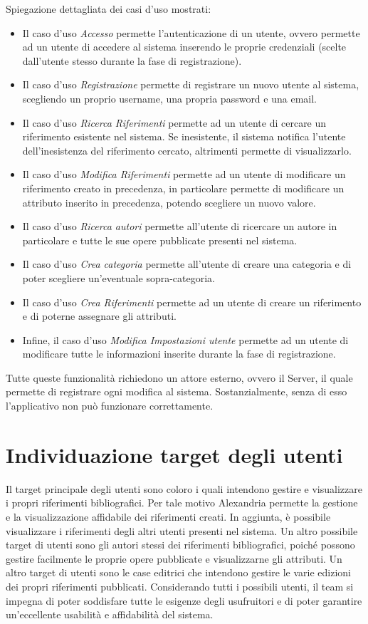 \newpage
Spiegazione dettagliata dei casi d'uso mostrati: 
\begin{itemize}
    \item Il caso d'uso \textit{Accesso} permette l'autenticazione di un utente, ovvero permette ad un utente di accedere al sistema inserendo le proprie credenziali (scelte dall'utente stesso durante la fase di registrazione).
    \item  Il caso d'uso \textit{Registrazione} permette di registrare un nuovo utente al sistema, scegliendo un proprio username, una propria password e una email.
    \item Il caso d'uso \textit{Ricerca Riferimenti} permette ad un utente di cercare un riferimento esistente nel sistema. Se inesistente, il sistema notifica l'utente dell'inesistenza del riferimento cercato, altrimenti permette di visualizzarlo. 
    \item Il caso d'uso \textit{Modifica Riferimenti} permette ad un utente di modificare un riferimento creato in precedenza, in particolare permette di modificare un \gls{attributo} inserito in precedenza,  potendo scegliere un nuovo valore. 
    \item  Il caso d'uso \textit{Ricerca autori} permette all'utente di ricercare un autore in particolare e tutte le sue opere pubblicate presenti nel sistema.
    \item Il caso d'uso \textit{Crea categoria} permette all'utente di creare una categoria e di poter scegliere un'eventuale \gls{sopra-categoria}.
    \item  Il caso d'uso \textit{Crea Riferimenti} permette ad un utente di creare un riferimento e di poterne assegnare gli attributi. 
    \item Infine, il caso d'uso \textit{Modifica Impostazioni utente} permette ad un utente di modificare tutte le informazioni inserite durante la fase di registrazione.
\end{itemize}
Tutte queste funzionalità richiedono un attore esterno, ovvero il Server, il quale permette di registrare ogni modifica al sistema. Sostanzialmente, senza di esso l'applicativo non può funzionare correttamente.


\raggedright{\section{Individuazione target degli utenti}}
Il target principale degli utenti sono coloro i quali intendono gestire e visualizzare i propri riferimenti bibliografici. Per tale motivo Alexandria permette la gestione e la visualizzazione affidabile dei riferimenti creati. In aggiunta, è possibile visualizzare i riferimenti degli altri utenti presenti nel sistema.
Un altro possibile target di utenti sono gli autori stessi dei riferimenti bibliografici, poiché possono gestire facilmente le proprie opere pubblicate e visualizzarne gli attributi.
Un altro target di utenti sono le case editrici che intendono gestire le varie edizioni dei propri riferimenti pubblicati. 
Considerando tutti i possibili utenti, il team si impegna di poter soddisfare tutte le esigenze degli usufruitori e di poter garantire un'eccellente usabilità e affidabilità del sistema.

